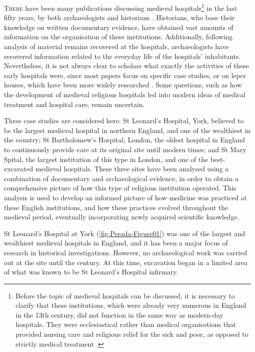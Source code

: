 \documentclass[%
	]{ijsra}
\begin{document}
\IJSRAopening%
\lettrine{T}{here} have been many publications discussing medieval hospitals\footnote{Before the topic of medieval hospitals can be discussed, it is necessary to clarify that these institutions, which were already very numerous in England in the 13th century, did not function in the same way as modern-day hospitals. They were ecclesiastical rather than medical organisations that provided nursing care and religious relief for the sick and poor, as opposed to strictly medical treatment \parencite{Clay_1966}.} 
in the last fifty years, by both archaeologists and historians \parencites{Cullum_1991}{Phillpotts_1997}{Rawcliffe_1999}{White_2007}. 
Historians, who base their knowledge on written documentary evidence, have obtained vast amounts of information on the organisation of these institutions. Additionally, following analysis of material remains recovered at the hospitals, archaeologists have recovered information related to the everyday life of the hospitals’ inhabitants. Nevertheless, it is not always clear to scholars what exactly the activities of these early hospitals were, since most papers focus on specific case studies, or on leper houses, which have been more widely researched \parencite[76-78]{Watson_2006}. 
Some questions, such as how the development of medieval religious hospitals led into modern ideas of medical treatment and hospital care, remain uncertain.

Three case studies are considered here: St Leonard’s Hospital, York, believed to be the largest medieval hospital in northern England, and one of the wealthiest in the country; St Bartholomew’s Hospital, London, the oldest hospital in England to continuously provide care at its original site until modern times; and St Mary Spital, the largest institution of this type in London, and one of the best-excavated medieval hospitals. 
These three sites have been analysed using a combination of documentary and archaeological evidence, in order to obtain a comprehensive picture of how this type of religious institution operated. This analysis is used to develop an informed picture of how medicine was practiced at these English institutions, and how these practices evolved throughout the medieval period, eventually incorporating newly acquired scientific knowledge.


St Leonard’s Hospital at York (\cref{fig:Perada-Figure01}) %
 was one of the largest and wealthiest medieval hospitals in England, and it has been a major focus of research in historical investigations. However, no archaeological work was carried out at the site until the  century. 
 At this time, excavation began in a limited area of what was known to be St Leonard’s Hospital infirmary.
 
\end{document}
